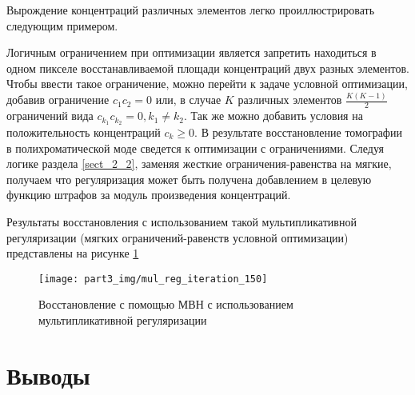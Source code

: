 Вырождение концентраций различных элементов легко проиллюстрировать следующим примером.


Логичным ограничением при оптимизации является запретить находиться в одном пикселе восстанавливаемой площади концентраций двух разных элементов.
Чтобы ввести такое ограничение, можно перейти к задаче условной оптимизации, добавив ограничение $c_1 c_2 = 0$ или, в случае $K$ различных элементов $\frac{ K (K - 1) } { 2 }$ ограничений вида $c_{k_1} c_{k_2} = 0, k_1 \neq k_2$.
Так же можно добавить условия на положительность концентраций $c_k \geq 0$.
В результате восстановление томографии в полихроматической моде сведется к оптимизации с ограничениями.
Следуя логике раздела \ref{sect_2_2}, заменяя жесткие ограничения-равенства на мягкие, получаем что регуляризация может быть получена добавлением в целевую функцию штрафов за модуль произведения концентраций. 

Результаты восстановления с использованием такой мультипликативной регуляризации (мягких ограничений-равенств условной оптимизации) представлены на рисунке \ref{fig:wrart_mulreg_150}

\begin{figure}
  \centering
  \texttt{[image: part3\_img/mul\_reg\_iteration\_150]}
  \caption{Восстановление с помощью МВН с использованием мультипликативной регуляризации}
  \label{fig:wrart_mulreg_150}
\end{figure}


\section{Выводы} \label{sect_3_3}
